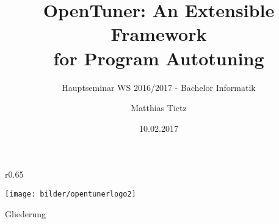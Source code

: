 
\usepackage[utf8]{inputenc}
\usepackage{babel}
\usepackage{floatflt}
\usepackage{float}
\usepackage{graphics}
\usepackage{graphicx}
\usepackage{listings}
\usepackage{color}
\usepackage{url}
\usepackage{hyperref}
\usepackage{wrapfig}


%
%


\title{OpenTuner: An Extensible Framework\\for Program Autotuning}
\subtitle{Hauptseminar WS 2016/2017 - Bachelor Informatik}
\author{Matthias Tietz}
\date{10.02.2017}
\institute[TUC]



    \tucthreeheadlines
    
    \begingroup
      \begin{frame}
        \titlepage
      \end{frame}
    \endgroup

    \begingroup
    \begin{frame}
        \begin{wrapfigure}{r}{0.65\textwidth}
          \begin{center}
            \texttt{[image: bilder/opentunerlogo2]}
          \end{center}
        \end{wrapfigure}
        \large{Gliederung}
        \normalsize \tableofcontents  
    \end{frame}
    \endgroup

    \tuctwoheadlines

    
